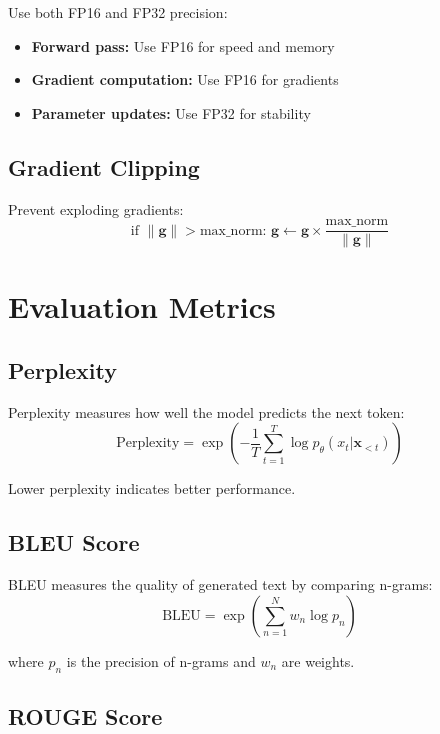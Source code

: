 Use both FP16 and FP32 precision:
\begin{itemize}
    \item \textbf{Forward pass:} Use FP16 for speed and memory
    \item \textbf{Gradient computation:} Use FP16 for gradients
    \item \textbf{Parameter updates:} Use FP32 for stability
\end{itemize}

\subsection{Gradient Clipping}

Prevent exploding gradients:
\begin{equation}
    \text{if } \|\mathbf{g}\| > \text{max\_norm: } \mathbf{g} \leftarrow \mathbf{g} \times \frac{\text{max\_norm}}{\|\mathbf{g}\|}
\end{equation}

\section{Evaluation Metrics}

\subsection{Perplexity}

Perplexity measures how well the model predicts the next token:
\begin{equation}
    \text{Perplexity} = \exp\left(-\frac{1}{T} \sum_{t=1}^T \log p_\theta(x_t | \mathbf{x}_{<t})\right)
\end{equation}

Lower perplexity indicates better performance.

\subsection{BLEU Score}

BLEU measures the quality of generated text by comparing n-grams:
\begin{equation}
    \text{BLEU} = \exp\left(\sum_{n=1}^N w_n \log p_n\right)
\end{equation}

where $p_n$ is the precision of n-grams and $w_n$ are weights.

\subsection{ROUGE Score}


